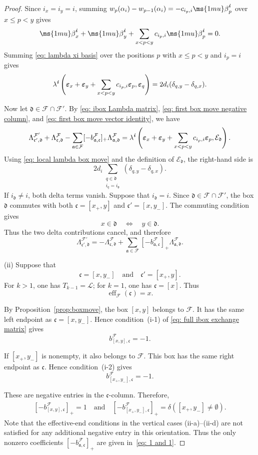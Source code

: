 \documentclass[12pt, leqno]{amsart}
\numberwithin{equation}{section}
\theoremstyle{plain}
\theoremstyle{definition}
\renewcommand{\le}{\leqslant}
\newcommand{\be}{{\ms{1mu}\beta}}
\newcommand{\ve}{\boldsymbol{\varepsilon}}
\newcommand{\ii}{ \textbf{\textit{i}}}
\newcommand{\eff}{\operatorname{eff}}
\newcommand{\fraka}{\mathfrak{a}}
\newcommand{\frakc}{\mathfrak{c}}
\newcommand{\frakd}{\mathfrak{d}}
\newcommand{\calE}{\mathcal{E}}
\newcommand{\calF}{\mathcal{F}}
\newcommand{\calL}{\mathcal{L}}
\newcommand{\qtq}[1][{and}]{\quad\text{{#1}}\quad}
\begin{document}
\begin{proof}
Since $i_x=i_y=i$, summing $w_p(\alpha_i)-w_{p-1}(\alpha_i) = -c_{i_p,i}\be_p^\ii$
over $x\le p<y$ gives
\[
\be_x^\ii+\be_y^\ii +\sum_{x<p<y}c_{i_p,i}\be_p^\ii =0.
\]
 Summing \eqref{eq: lambda xi basis} over the positions $p$ with
$x\le p<y$ and $i_p=i$ gives{}
\begin{equation}\label{eq: local lambda box move}
\lambda^\ii
\left(
\ve_x+\ve_y+\sum_{x<p<y}c_{i_p,i}\ve_p,
\ve_q
\right)
=
2d_i(\delta_{q,y}-\delta_{q,x}).
\end{equation}

Now let $\frakd\in\calF\cap\calF'$. By
\eqref{eq: ibox Lambda matrix},
\eqref{eq: first box move negative column}, and
\eqref{eq: first box move vector identity}, we have
\[
\Lambda^{\calF'}_{\frakc',\frakd} +\Lambda^\calF_{\frakc,\frakd} -\sum_{\fraka\in\calF} [-b^\calF_{\fraka,\frakc}]_+ \Lambda^\calF_{\fraka,\frakd}
= \lambda^\ii \left( \ve_x+\ve_y+\sum_{x<p<y}c_{i_p,i}\ve_p, \calE_{\frakd} \right).
\]
Using \eqref{eq: local lambda box move} and the definition of
$\calE_{\frakd}$, the right-hand side is
\[
2d_i
\sum_{\substack{q\in\frakd\\i_q=i_{\frakd}}}
(\delta_{q,y}-\delta_{q,x}).
\]
If $i_{\frakd}\neq i$, both delta terms vanish. Suppose that
$i_{\frakd}=i$. Since $\frakd\in\calF\cap\calF'$, the box $\frakd$ commutes with
both $\frakc=[x_+,y]$ and $\frakc'=[x,y_-]$.
The commuting condition gives
\[
x\in\frakd
\quad\Longleftrightarrow\quad
y\in\frakd.
\]
Thus the two delta contributions cancel, and therefore
\[
\Lambda^{\calF'}_{\frakc',\frakd}
=
-\Lambda^\calF_{\frakc,\frakd}
+
\sum_{\fraka\in\calF}
[-b^\calF_{\fraka,\frakc}]_+
\Lambda^\calF_{\fraka,\frakd}.
\]

\smallskip

\noindent
{\rm (ii)}
Suppose that
\[
\frakc=[x,y_-] \qtq \frakc'=[x_+,y].
\]
For $k>1$, one has $T_{k-1}=\calL$; for $k=1$, one has
$\frakc=[x]$. Thus
\[
\eff_{\calF}(\frakc)=x.
\]

By Proposition~\ref{prop:boxmove}, the box $[x,y]$ belongs to
$\calF$. It has the same left endpoint as $\frakc=[x,y_-].$
Hence condition~{\rm (i-1)} of \eqref{eq: full ibox exchange matrix} gives
\[
b^\calF_{[x,y],\frakc}=-1.
\]

If $[x_+,y_-]$ is nonempty, it also belongs to $\calF$. This box
has the same right endpoint as $\frakc$. Hence condition~{\rm (i-2)} gives
\[
b^\calF_{[x_+,y_-],\frakc}=-1.
\]

These are negative entries in the $\frakc$-column.
Therefore,
\begin{align} \label{eq: 1 and 1}
[-b^\calF_{[x,y],\frakc}]_+=1
\quad\text{and}\quad
[-b^\calF_{[x_+,y_-],\frakc}]_+=\delta([x_+,y_-] \ne \emptyset).
\end{align}
Note that the effective-end conditions in the vertical cases
{\rm (ii-a)}--{\rm (ii-d)} are not satisfied for any additional
negative entry in this orientation. Thus the only nonzero coefficients
$[-b^\calF_{\fraka,\frakc}]_+$ are given in~\eqref{eq: 1 and 1}.


\end{proof}
\end{document}
